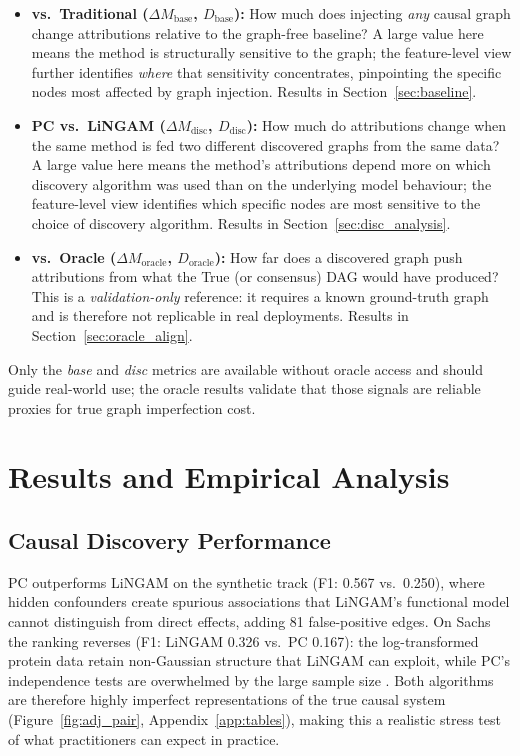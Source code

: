 \documentclass[12pt,letterpaper,twocolumn]{article}
\begin{document}
\begin{itemize}[nosep, leftmargin=1em]
  \item \textbf{vs.\ Traditional ($\Delta M_{\text{base}}$, $D_{\text{base}}$):}
  How much does injecting \emph{any} causal graph change attributions relative to the
  graph-free baseline? A large value here means the method is structurally sensitive to
  the graph; the feature-level view further identifies \emph{where} that sensitivity
  concentrates, pinpointing the specific nodes most affected by graph injection.
  Results in Section~\ref{sec:baseline}.

  \item \textbf{PC vs.\ LiNGAM ($\Delta M_{\text{disc}}$, $D_{\text{disc}}$):}
  How much do attributions change when the same method is fed two different discovered
  graphs from the same data? A large value here means the method's attributions depend
  more on which discovery algorithm was used than on the underlying model behaviour;
  the feature-level view identifies which specific nodes are most sensitive to the
  choice of discovery algorithm. Results in Section~\ref{sec:disc_analysis}.


  \item \textbf{vs.\ Oracle ($\Delta M_{\text{oracle}}$, $D_{\text{oracle}}$):}
  How far does a discovered graph push attributions from what the True (or consensus)
  DAG would have produced? This is a \emph{validation-only} reference: it requires a
  known ground-truth graph and is therefore not replicable in real deployments.
  Results in Section~\ref{sec:oracle_align}.
\end{itemize}

Only the \textit{base} and \textit{disc} metrics are available without oracle access
and should guide real-world use; the oracle results validate that those signals are
reliable proxies for true graph imperfection cost.

\section{Results and Empirical Analysis}
\label{sec:results}

\subsection{Causal Discovery Performance}
PC outperforms LiNGAM on the synthetic track (F1: 0.567 vs.\ 0.250), where hidden
confounders create spurious associations that LiNGAM's functional model cannot
distinguish from direct effects, adding 81 false-positive edges. On Sachs the ranking
reverses (F1: LiNGAM 0.326 vs.\ PC 0.167): the log-transformed protein data retain
non-Gaussian structure that LiNGAM can exploit, while PC's independence tests are
overwhelmed by the large sample size \citep{Glymour2019}. Both algorithms are therefore
highly imperfect representations of the true causal system
(Figure~\ref{fig:adj_pair}, Appendix~\ref{app:tables}), making this a realistic
stress test of what practitioners can expect in practice.
\end{document}
